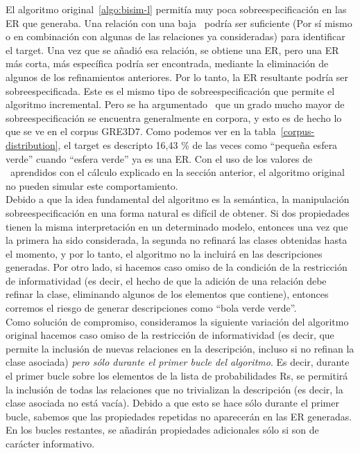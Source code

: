 El algoritmo original~\ref{algo:bisim-l}
 permit\'ia muy poca sobreespecificaci\'on en las ER que
generaba. Una relaci\'on con una baja \puse\ podr\'{i}a ser suficiente
(Por s\'{i} mismo o en combinaci\'on con algunas de las relaciones ya consideradas) para
identificar el target. Una vez que se a\~nadi\'o esa relaci\'on, se obtiene una ER, pero una ER m\'as corta, m\'as espec\'{i}fica podr\'{i}a ser encontrada, mediante la eliminaci\'on de algunos de los refinamientos anteriores.
Por lo tanto, la ER resultante podr\'{i}a ser sobreespecificada. Este es el mismo tipo de sobreespecificaci\'on
que permite el algoritmo incremental. Pero se ha argumentado~\cite{Engelhardt_Bailey_Ferreira_2006, Arts_Maes_Noordman_Jansen_2011} que
un grado mucho mayor de sobreespecificaci\'on se encuentra generalmente en corpora, y esto
es de hecho lo que se ve en el corpus GRE3D7. Como podemos ver en la tabla~\ref{corpus-distribution},
el target es descripto 16,43 \% de las veces como ``peque\~na esfera verde'' cuando ``esfera verde'' ya es una ER. Con el uso de los valores de \puse\ aprendidos con el c\'alculo explicado en la secci\'on anterior, el algoritmo original no pueden simular este comportamiento.\\

Debido a que la idea fundamental del algoritmo es la sem\'antica, la manipulaci\'on sobreespecificaci\'on en
una forma natural es dif\'{i}cil de obtener. Si dos propiedades tienen la misma interpretaci\'on en un determinado
modelo, entonces una vez que la primera ha sido considerada, la segunda no refinar\'a las clases
obtenidas hasta el momento, y por lo tanto, el algoritmo no la incluir\'a en las descripciones generadas.
Por otro lado, si hacemos caso omiso de la condici\'on de la restricci\'on de informatividad (es decir,
el hecho de que la adici\'on de una relaci\'on debe refinar la clase, eliminando algunos de
los elementos que contiene), entonces corremos el riesgo de generar descripciones como ``bola verde verde''.\\

Como soluci\'on de compromiso, consideramos la siguiente variaci\'on del algoritmo
original %
hacemos caso omiso de la restricci\'on de informatividad (es decir, que permite la inclusi\'on de nuevas relaciones
en la descripci\'on, incluso si no refinan la clase asociada) \emph{pero s\'olo durante el
primer bucle del algoritmo}. Es decir, durante el primer bucle sobre los elementos de la
lista de probabilidades Rs, se permitir\'a la inclusi\'on de todas las relaciones que no trivializan la
descripci\'on (es decir, la clase asociada no est\'a vac\'{i}a). Debido a que esto se hace s\'olo durante
el primer bucle, sabemos que las propiedades repetidas no aparecer\'an en las ER generadas.
En los bucles restantes, se a\~nadir\'an propiedades adicionales s\'olo si son de car\'acter informativo.\\

